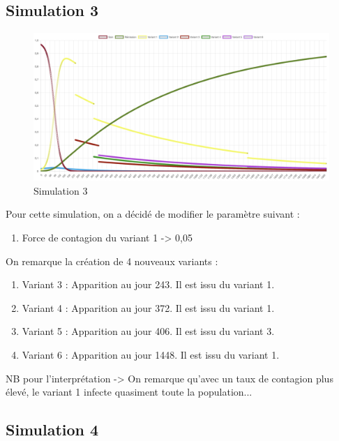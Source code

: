 \documentclass{article}
\begin{document}
\subsection{Simulation 3}

\begin{figure}[h]
    \includegraphics[width=\linewidth]{images/Simulation3.png}
    \caption{Simulation 3}
    \label{fig:simulation3}
\end{figure}

Pour cette simulation, on a décidé de modifier le paramètre suivant : 
\begin{enumerate}
    \item Force de contagion du variant 1 -> 0,05 \\
\end{enumerate}
\noindent
On remarque la création de 4 nouveaux variants : \\
\begin{enumerate}
    \item Variant 3 : Apparition au jour 243. Il est issu du variant 1. 
    \item Variant 4 : Apparition au jour 372. Il est issu du variant 1.
    \item Variant 5 : Apparition au jour 406. Il est issu du variant 3.
    \item Variant 6 : Apparition au jour 1448. Il est issu du variant 1. \\
\end{enumerate}

NB pour l'interprétation -> On remarque qu'avec un taux de contagion plus élevé, le variant 1 infecte quasiment toute la population... \\

\subsection{Simulation 4}
\end{document}
